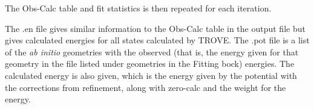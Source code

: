 The Obs-Calc table and fit statistics is then repeated for each iteration.

The .en file gives similar information to the Obs-Calc table in the output file but gives calculated energies for all
states calculated by TROVE. The .pot file is a list of the \textit{ab initio} geometries with the observed (that is,
the energy given for that geometry in the file listed under geometries in the Fitting bock) energies. The calculated 
energy is also given, which is the energy given by the potential with the corrections from refinement, along with
zero-calc and the weight for the energy. 



















